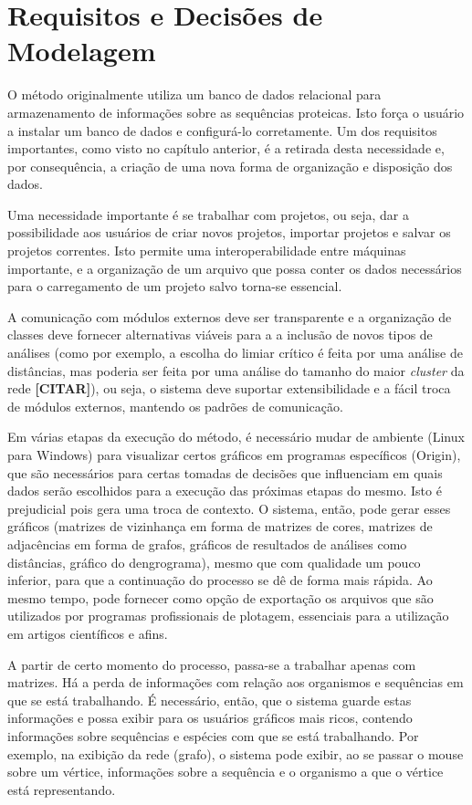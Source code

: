 \section{Requisitos e Decisões de Modelagem} \label{sec:escopo}

O método originalmente utiliza um banco de dados relacional para armazenamento de informações sobre as sequências proteicas. Isto força o usuário a instalar
um banco de dados e configurá-lo corretamente. Um dos requisitos importantes, como visto no capítulo anterior, é a retirada desta necessidade e,
por consequência, a criação de uma nova forma de organização e disposição dos dados.

Uma necessidade importante é se trabalhar com projetos, ou seja, dar a possibilidade aos usuários de criar novos projetos, importar projetos e salvar os
projetos correntes. Isto permite uma interoperabilidade entre máquinas importante, e a organização de um arquivo que possa conter os dados necessários
para o carregamento de um projeto salvo torna-se essencial.

A comunicação com módulos externos deve ser transparente e a organização de classes deve fornecer alternativas viáveis para a a inclusão de novos
tipos de análises (como por exemplo, a escolha do limiar crítico é feita por uma análise de distâncias, mas poderia ser feita por uma análise do tamanho
do maior \textit{cluster} da rede \textbf{[CITAR]}), ou seja, o sistema deve suportar extensibilidade e a fácil troca de módulos externos, mantendo
os padrões de comunicação.

Em várias etapas da execução do método, é necessário mudar de ambiente (Linux para Windows) para visualizar certos gráficos em programas específicos (Origin),
que são necessários para certas tomadas de decisões que influenciam em quais dados serão escolhidos para a execução das próximas etapas do mesmo. Isto é
prejudicial pois gera uma troca de contexto. O sistema, então, pode gerar esses gráficos (matrizes de vizinhança em forma de matrizes de cores, matrizes de
adjacências em forma de grafos, gráficos de resultados de análises como distâncias, gráfico do dengrograma), mesmo que com qualidade um pouco inferior,
para que a continuação do processo se dê de forma mais rápida. Ao mesmo tempo, pode fornecer como opção de exportação os arquivos que são utilizados por
programas profissionais de plotagem, essenciais para a utilização em artigos científicos e afins.

A partir de certo momento do processo, passa-se a trabalhar apenas com matrizes. Há a perda de informações com relação aos organismos e sequências em que se
está trabalhando. É necessário, então, que o sistema guarde estas informações e possa exibir para os usuários gráficos mais ricos, contendo informações sobre
sequências e espécies com que se está trabalhando. Por exemplo, na exibição da rede (grafo), o sistema pode exibir, ao se passar o mouse sobre um vértice,
informações sobre a sequência e o organismo a que o vértice está representando.

